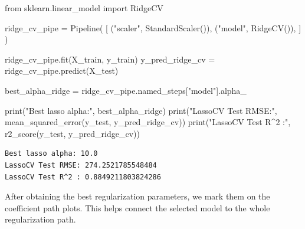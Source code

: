 \documentclass[
  letterpaper,
  DIV=11,
  numbers=noendperiod]{scrreprt}
\newenvironment{Shaded}{\begin{snugshade}}{\end{snugshade}}
\newcommand{\BuiltInTok}[1]{\textcolor[rgb]{0.00,0.23,0.31}{#1}}
\newcommand{\ImportTok}[1]{\textcolor[rgb]{0.00,0.46,0.62}{#1}}
\newcommand{\NormalTok}[1]{\textcolor[rgb]{0.00,0.23,0.31}{#1}}
\newcommand{\OperatorTok}[1]{\textcolor[rgb]{0.37,0.37,0.37}{#1}}
\newcommand{\StringTok}[1]{\textcolor[rgb]{0.13,0.47,0.30}{#1}}
\theoremstyle{definition}
\theoremstyle{definition}
\theoremstyle{plain}
\theoremstyle{plain}
\theoremstyle{remark}
\begin{document}
\begin{Shaded}
\begin{Highlighting}[]
\ImportTok{from}\NormalTok{ sklearn.linear\_model }\ImportTok{import}\NormalTok{ RidgeCV}

\NormalTok{ridge\_cv\_pipe }\OperatorTok{=}\NormalTok{ Pipeline(}
\NormalTok{    [}
\NormalTok{        (}\StringTok{"scaler"}\NormalTok{, StandardScaler()),}
\NormalTok{        (}\StringTok{"model"}\NormalTok{, RidgeCV()),}
\NormalTok{    ]}
\NormalTok{)}

\NormalTok{ridge\_cv\_pipe.fit(X\_train, y\_train)}
\NormalTok{y\_pred\_ridge\_cv }\OperatorTok{=}\NormalTok{ ridge\_cv\_pipe.predict(X\_test)}

\NormalTok{best\_alpha\_ridge }\OperatorTok{=}\NormalTok{ ridge\_cv\_pipe.named\_steps[}\StringTok{"model"}\NormalTok{].alpha\_}

\BuiltInTok{print}\NormalTok{(}\StringTok{"Best lasso alpha:"}\NormalTok{, best\_alpha\_ridge)}
\BuiltInTok{print}\NormalTok{(}\StringTok{"LassoCV Test RMSE:"}\NormalTok{, mean\_squared\_error(y\_test, y\_pred\_ridge\_cv))}
\BuiltInTok{print}\NormalTok{(}\StringTok{"LassoCV Test R\^{}2 :"}\NormalTok{, r2\_score(y\_test, y\_pred\_ridge\_cv))}
\end{Highlighting}
\end{Shaded}

\begin{verbatim}
Best lasso alpha: 10.0
LassoCV Test RMSE: 274.2521785548484
LassoCV Test R^2 : 0.8849211803824286
\end{verbatim}

After obtaining the best regularization parameters, we mark them on the
coefficient path plots. This helps connect the selected model to the
whole regularization path.
\end{document}
